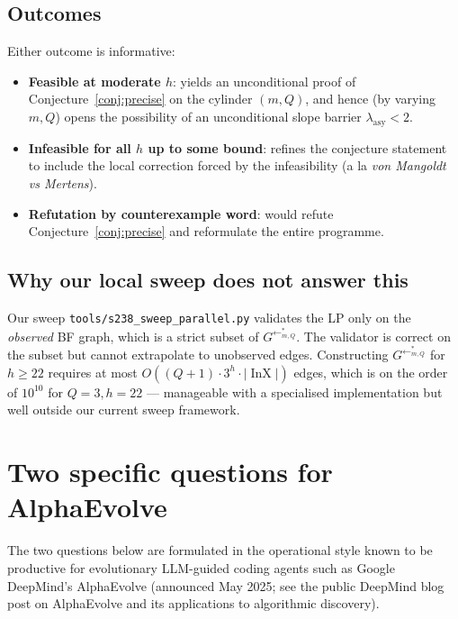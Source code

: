 \documentclass[11pt,a4paper]{article}
\theoremstyle{plain}
\theoremstyle{definition}
\newcommand{\InvG}{G^{\!\leftarrow}}
\DeclareMathOperator{\InX}{InX}
\begin{document}
\subsection{Outcomes}

Either outcome is informative:

\begin{itemize}
  \item \textbf{Feasible at moderate $h$}: yields an
        unconditional proof of Conjecture~\ref{conj:precise} on
        the cylinder $(m, Q)$, and hence (by varying $m, Q$)
        opens the possibility of an unconditional slope barrier
        $\lambda_{\mathrm{asy}} < 2$.
  \item \textbf{Infeasible for all $h$ up to some bound}: refines
        the conjecture statement to include the local correction
        forced by the infeasibility (a la
        \emph{von Mangoldt vs Mertens}).
  \item \textbf{Refutation by counterexample word}: would refute
        Conjecture~\ref{conj:precise} and reformulate the entire
        programme.
\end{itemize}

\subsection{Why our local sweep does not answer this}

Our sweep \texttt{tools/s238\_sweep\_parallel.py} validates the
LP only on the \emph{observed} BF graph, which is a strict subset
of $\InvG^{*}_{m, Q}$. The validator is correct on the subset
but cannot extrapolate to unobserved edges. Constructing
$\InvG^{*}_{m, Q}$ for $h \ge 22$ requires at most
$O((Q + 1) \cdot 3^h \cdot |\InX|)$ edges, which is on the order
of $10^{10}$ for $Q = 3, h = 22$ — manageable with a
specialised implementation but well outside our current sweep
framework.

\section{Two specific questions for AlphaEvolve}\label{sec:alphaevolve}

The two questions below are formulated in the operational style
known to be productive for evolutionary LLM-guided coding agents
such as Google DeepMind's AlphaEvolve (announced May 2025;
see the public DeepMind blog post on AlphaEvolve and its
applications to algorithmic discovery).
\end{document}
